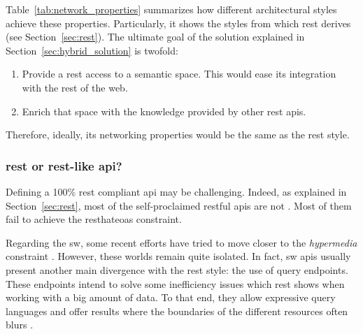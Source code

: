 
Table~\ref{tab:network_properties} summarizes how different architectural styles achieve these properties.
Particularly, it shows the styles from which \ac{rest} derives (see Section~\ref{sec:rest}).
The ultimate goal of the solution explained in Section~\ref{sec:hybrid_solution} is twofold:
\begin{enumerate}
  \item Provide a \ac{rest} access to a semantic space.
       This would ease its integration with the rest of the web.
  \item Enrich that space with the knowledge provided by other \ac{rest} \acp{api}.
\end{enumerate}
Therefore, ideally, its networking properties would be the same as the \ac{rest} style.






\subsubsection{\acs{rest} or \acs{rest}-like \ac{api}?}

Defining a 100\% \ac{rest} compliant \ac{api} may be challenging.
Indeed, as explained in Section~\ref{sec:rest}, most of the self-proclaimed \ac{rest}ful \acp{api} are not \citep{house_how_2012}.
Most of them fail to achieve the \ac{resthateoas} constraint.


Regarding the \ac{sw}, some recent efforts have tried to move closer to the \emph{hypermedia} constraint \citep{steiner_fulfilling_2011,kjernsmo_necessity_2012}.
However, these worlds remain quite isolated.
In fact, \ac{sw} \acp{api} usually present another main divergence with the \ac{rest} style: the use of query endpoints.
These endpoints intend to solve some inefficiency issues which \ac{rest} shows when working with a big amount of data. %
To that end, they allow expressive query languages and offer results where the boundaries of the different resources often blurs \citep{wilde_restful_2009}.

